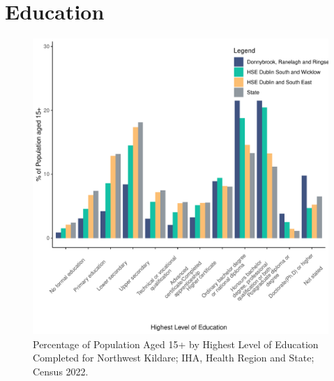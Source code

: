 \documentclass{article}
\begin{document}
\section{Education}\label{sect:Edu}
\begin{figure}[H]
	\centering
	\includegraphics[width = 120mm]{../figures/EduED.pdf}
	\caption{Percentage of Population Aged 15+ by Highest Level of Education Completed for Northwest Kildare; IHA, Health Region and State; Census 2022.}
	\label{fig:vbnv}
	\end{figure}
\end{document}
